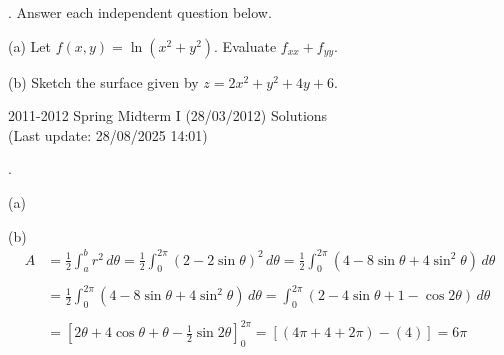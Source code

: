 \documentclass{article}
\begin{document}
\hfill

\hfill

. Answer each independent question below.

\hfill

(a) Let $f(x,y)=\ln\left(x^2+y^2\right)$. Evaluate $f_{xx}+f_{yy}$.

\hfill

(b) Sketch the surface given by $z=2x^2+y^2+4y+6$.

\newpage

\begin{center}
2011-2012 Spring Midterm I (28/03/2012) Solutions\\
(Last update: 28/08/2025 14:01)
\end{center}

.

\hfill

\noindent (a)
\begin{center}
\end{center}

\noindent (b)
\begin{align*}A&=\frac12\int_a^br^2\,d\theta=\frac12\int_0^{2\pi}\left(2-2\sin\theta\right)^2\,d\theta=\frac12\int_0^{2\pi}\left(4-8\sin\theta+4\sin^2\theta\right)\,d\theta\\\\&=\frac12\int_0^{2\pi}\left(4-8\sin\theta+4\sin^2\theta\right)\,d\theta=\int_0^{2\pi}\left(2-4\sin\theta+1-\cos2\theta\right)\,d\theta\\\\&=\left[2\theta+4\cos\theta+\theta-\frac12\sin2\theta\right]_0^{2\pi}=\left[\left(4\pi+4+2\pi\right)-(4)\right]=\boxed{6\pi}\end{align*}
\end{document}
